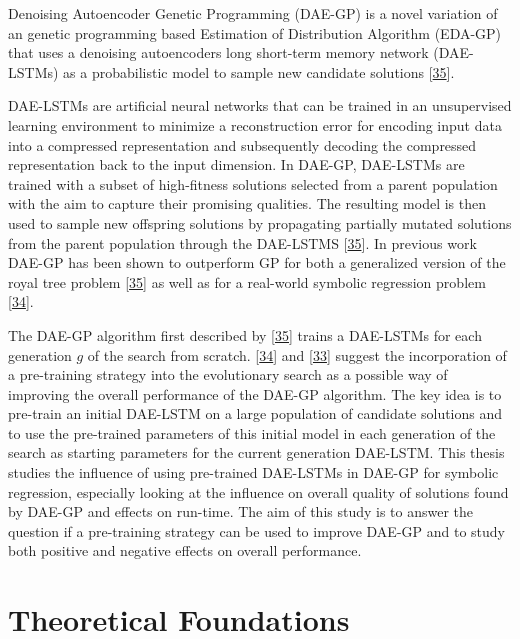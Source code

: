 \documentclass[
  11pt,
]{article}
\begin{document}
Denoising Autoencoder Genetic Programming (DAE-GP) is a novel variation of an genetic programming based Estimation of Distribution Algorithm (EDA-GP) that uses a denoising autoencoders long short-term memory network (DAE-LSTMs) as a probabilistic model to sample new candidate solutions {[}\protect\hyperlink{ref-dae-gp_2020_rtree}{35}{]}.

DAE-LSTMs are artificial neural networks that can be trained in an unsupervised learning environment to minimize a reconstruction error for encoding input data into a compressed representation and subsequently decoding the compressed representation back to the input dimension.
In DAE-GP, DAE-LSTMs are trained with a subset of high-fitness solutions selected from a parent population with the aim to capture their promising qualities.
The resulting model is then used to sample new offspring solutions by propagating partially mutated solutions from the parent population through the DAE-LSTMS {[}\protect\hyperlink{ref-dae-gp_2020_rtree}{35}{]}.
In previous work DAE-GP has been shown to outperform GP for both a generalized version of the royal tree problem {[}\protect\hyperlink{ref-dae-gp_2020_rtree}{35}{]} as well as for a real-world symbolic regression problem {[}\protect\hyperlink{ref-dae-gp_2022_symreg}{34}{]}.

The DAE-GP algorithm first described by {[}\protect\hyperlink{ref-dae-gp_2020_rtree}{35}{]} trains a DAE-LSTMs for each generation \(g\) of the search from scratch.
{[}\protect\hyperlink{ref-dae-gp_2022_symreg}{34}{]} and {[}\protect\hyperlink{ref-daegp_explore_exploit}{33}{]} suggest the incorporation of a pre-training strategy into the evolutionary search as a possible way of improving the overall performance of the DAE-GP algorithm.
The key idea is to pre-train an initial DAE-LSTM on a large population of candidate solutions and to use the pre-trained parameters of this initial model in each generation of the search as starting parameters for the current generation DAE-LSTM.
This thesis studies the influence of using pre-trained DAE-LSTMs in DAE-GP for symbolic regression, especially looking at the influence on overall quality of solutions found by DAE-GP and effects on run-time.
The aim of this study is to answer the question if a pre-training strategy can be used to improve DAE-GP and to study both positive and negative effects on overall performance.

\hypertarget{theoretical-foundations}{%
\section{Theoretical Foundations}\label{theoretical-foundations}}
\end{document}
